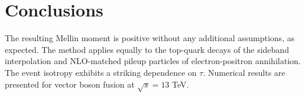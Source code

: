 \section{Conclusions}\label{sec:conclusions}

The resulting Mellin moment is positive without any additional
assumptions, as expected. The method applies equally to the top-quark
decays of the sideband interpolation and NLO-matched pileup particles of
electron-positron annihilation. The event isotropy exhibits a striking
dependence on $\tau$. Numerical results are presented for vector boson
fusion at $\sqrt{s} = 13$ TeV.


